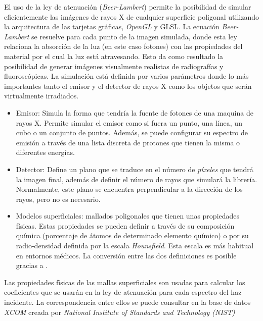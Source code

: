 El uso de la ley de atenuación (\emph{Beer-Lambert}) permite la posibilidad de simular eficientemente las imágenes de rayos X de cualquier superficie poligonal utilizando la arquitectura de las tarjetas gráficas, \emph{OpenGL} y \ac{GLSL}. La ecuación \emph{Beer-Lambert} se resuelve para cada punto de la imagen simulada, donde esta ley relaciona la absorción de la luz (en este caso fotones) con las propiedades del material por el cual la luz está atravesando. Esto da como resultado la posibilidad de generar imágenes visualmente realistas de radiografías y fluoroscópicas. 
La simulación está definida por varios parámetros donde lo más importantes tanto el emisor y el detector de rayos X como los objetos que serán virtualmente irradiados. 
\begin{itemize}
    \item Emisor: Simula la forma que tendría la fuente de fotones de una maquina de rayos X. Permite simular el emisor como si fuera un punto, una línea, un cubo o un conjunto de puntos. Además, se puede configurar su espectro de emisión a través de una lista discreta de protones que tienen la misma o diferentes energías.
    \item Detector: Define un plano que se traduce en el número de \emph{píxeles} que tendrá la imagen final, además de definir el número de rayos que simulará la librería. Normalmente, este plano se encuentra perpendicular a la dirección de los rayos, pero no es necesario.
    \item Modelos superficiales: mallados poligonales que tienen unas propiedades físicas. Estas propiedades se pueden definir a través de su composición química (porcentaje de átomos de determinado elemento químico)  o por su radio-densidad definida por la escala \emph{Hounsfield}. Esta escala es más habitual en entornos médicos. La conversión entre las dos definiciones es posible gracias a \cite{Schneider2000}.
\end{itemize}

Las propiedades físicas de las mallas superficiales son usadas para calcular los coeficientes que se usarán en la ley de atenuación para cada espectro del haz incidente. La correspondencia entre ellos se puede consultar en la base de datos \emph{XCOM} creada por \emph{National Institute of Standards
and Technology (NIST)}\cite{XCOM}






